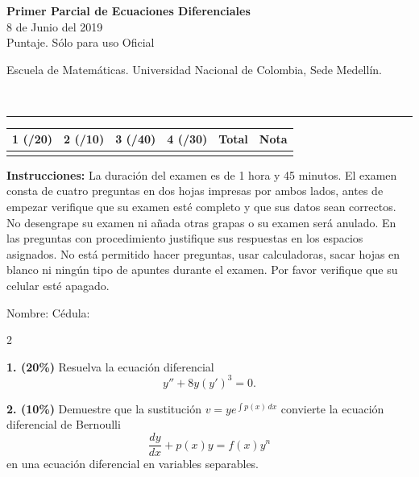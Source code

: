 \documentclass[11pt]{article}
\begin{document}
\noindent
\begin{minipage}[t]{0.62\linewidth}
  {\bfseries\large Primer Parcial de Ecuaciones Diferenciales}\\[2pt]
  {\small 8 de Junio del 2019}\\
  {\small Puntaje. Sólo para uso Oficial}
\end{minipage}%
\hfill
\begin{minipage}[t]{0.35\linewidth}
  \raggedleft\small Escuela de Matemáticas. Universidad Nacional de Colombia, Sede Medellín.
\end{minipage}\\[4pt]
\rule{\linewidth}{0.6pt}

\vspace{4pt}
\noindent
\begin{tabular}{|c|c|c|c|c|c|}
\hline
1 (/20) & 2 (/10) & 3 (/40) & 4 (/30) & Total & Nota \\
\hline
 & & & & & \\
\hline
\end{tabular}

\vspace{6pt}
\noindent\textbf{Instrucciones:} La duración del examen es de 1 hora y 45 minutos. El examen consta de cuatro preguntas en dos hojas impresas por ambos lados, antes de empezar verifique que su examen esté completo y que sus datos sean correctos. No desengrape su examen ni añada otras grapas o su examen será anulado. En las preguntas con procedimiento justifique sus respuestas en los espacios asignados. No está permitido hacer preguntas, usar calculadoras, sacar hojas en blanco ni ningún tipo de apuntes durante el examen. Por favor verifique que su celular esté apagado.

\vspace{8pt}
\noindent Nombre: \makebox[0.45\linewidth]{\hrulefill} \hfill Cédula: \makebox[0.3\linewidth]{\hrulefill}

\begin{multicols}{2}

\textbf{1. (20\%)} Resuelva la ecuación diferencial
\[
y''+8y(y')^3=0.
\]

\vspace{7cm}

\columnbreak

\textbf{2. (10\%)} Demuestre que la sustitución $v=ye^{\int p(x)\,dx}$ convierte la ecuación diferencial de Bernoulli
\[
\frac{dy}{dx}+p(x)y=f(x)y^n
\]
en una ecuación diferencial en variables separables.

\end{multicols}
\end{document}
